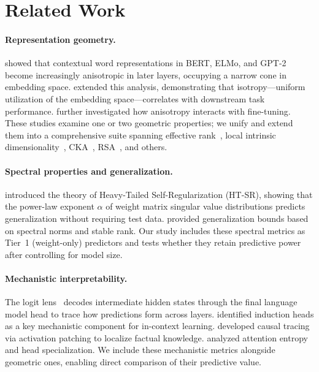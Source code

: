 \documentclass[preprint]{neurips_2025}
\begin{document}
\section{Related Work}
\label{sec:related}

\paragraph{Representation geometry.}
\citet{ethayarajh2019contextual} showed that contextual word representations in BERT, ELMo, and GPT-2 become increasingly anisotropic in later layers, occupying a narrow cone in embedding space.
\citet{cai2021isotropy} extended this analysis, demonstrating that isotropy---uniform utilization of the embedding space---correlates with downstream task performance.
\citet{godey2024anisotropy} further investigated how anisotropy interacts with fine-tuning.
These studies examine one or two geometric properties; we unify and extend them into a comprehensive suite spanning effective rank~\citep{roy2007effective}, local intrinsic dimensionality~\citep{levina2004maximum}, CKA~\citep{kornblith2019similarity}, RSA~\citep{kriegeskorte2008representational}, and others.

\paragraph{Spectral properties and generalization.}
\citet{martin2021implicit} introduced the theory of Heavy-Tailed Self-Regularization (HT-SR), showing that the power-law exponent $\alpha$ of weight matrix singular value distributions predicts generalization without requiring test data.
\citet{bartlett2017spectrally} provided generalization bounds based on spectral norms and stable rank.
Our study includes these spectral metrics as Tier~1 (weight-only) predictors and tests whether they retain predictive power after controlling for model size.

\paragraph{Mechanistic interpretability.}
The logit lens~\citep{nostalgebraist2020logitlens} decodes intermediate hidden states through the final language model head to trace how predictions form across layers.
\citet{olsson2022context} identified induction heads as a key mechanistic component for in-context learning.
\citet{meng2022locating} developed causal tracing via activation patching to localize factual knowledge.
\citet{clark2019what} analyzed attention entropy and head specialization.
We include these mechanistic metrics alongside geometric ones, enabling direct comparison of their predictive value.
\end{document}

